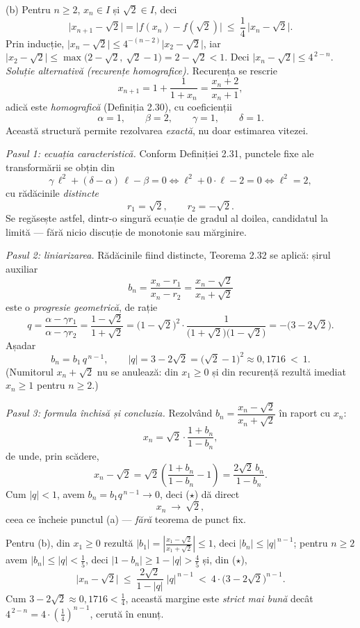 (b) Pentru $n\ge2$, $x_{n}\in I$ și $\sqrt2\in I$, deci
\[ \bigl|x_{n+1}-\sqrt2\bigr|=\bigl|f(x_{n})-f(\sqrt2)\bigr|\ \le\ \frac14\,\bigl|x_{n}-\sqrt2\bigr| . \]
Prin inducție, $\bigl|x_{n}-\sqrt2\bigr|\le4^{-(n-2)}\bigl|x_{2}-\sqrt2\bigr|$, iar $\bigl|x_{2}-\sqrt2\bigr|\le\max\bigl(2-\sqrt2,\ \sqrt2-1\bigr)=2-\sqrt2<1$. Deci $\bigl|x_{n}-\sqrt2\bigr|\le4^{\,2-n}$.\\[2pt]


\emph{Soluție alternativă (recurențe homografice).} Recurența se rescrie
\[ x_{n+1}=1+\frac{1}{1+x_{n}}=\frac{x_{n}+2}{x_{n}+1} , \]
adică este \emph{homografică} (Definiția 2.30), cu coeficienții
\[ \alpha=1,\qquad \beta=2,\qquad \gamma=1,\qquad \delta=1 . \]
Această structură permite rezolvarea \emph{exactă}, nu doar estimarea vitezei.

\emph{Pasul 1: ecuația caracteristică.} Conform Definiției 2.31, punctele fixe ale transformării se obțin din
\[ \gamma\,\ell^{2}+(\delta-\alpha)\,\ell-\beta=0 \Longleftrightarrow \ell^{2}+0\cdot\ell-2=0 \Longleftrightarrow \ell^{2}=2 , \]
cu rădăcinile \emph{distincte}
\[ r_{1}=\sqrt2,\qquad r_{2}=-\sqrt2 . \]
Se regăsește astfel, dintr-o singură ecuație de gradul al doilea, candidatul la limită --- fără nicio discuție de monotonie sau mărginire.

\emph{Pasul 2: liniarizarea.} Rădăcinile fiind distincte, Teorema 2.32 se aplică: șirul auxiliar
\[ b_{n}=\frac{x_{n}-r_{1}}{x_{n}-r_{2}}=\frac{x_{n}-\sqrt2}{x_{n}+\sqrt2} \]
este o \emph{progresie geometrică}, de rație
\[ q=\frac{\alpha-\gamma r_{1}}{\alpha-\gamma r_{2}}=\frac{1-\sqrt2}{1+\sqrt2}=\bigl(1-\sqrt2\bigr)^{2}\cdot\frac{1}{\bigl(1+\sqrt2\bigr)\bigl(1-\sqrt2\bigr)}=-\bigl(3-2\sqrt2\bigr) . \]
Așadar
\[ b_{n}=b_{1}\,q^{\,n-1},\qquad |q|=3-2\sqrt2=\bigl(\sqrt2-1\bigr)^{2}\approx0{,}1716\ <\ 1 . \]
(Numitorul $x_{n}+\sqrt2$ nu se anulează: din $x_{1}\ge0$ și din recurență rezultă imediat $x_{n}\ge1$ pentru $n\ge2$.)

\emph{Pasul 3: formula închisă și concluzia.} Rezolvând $b_{n}=\dfrac{x_{n}-\sqrt2}{x_{n}+\sqrt2}$ în raport cu $x_{n}$:
\[ x_{n}=\sqrt2\cdot\frac{1+b_{n}}{1-b_{n}} , \]
de unde, prin scădere,
\[ x_{n}-\sqrt2=\sqrt2\left(\frac{1+b_{n}}{1-b_{n}}-1\right)=\frac{2\sqrt2\,b_{n}}{1-b_{n}} . \tag{$\star$} \]
Cum $|q|<1$, avem $b_{n}=b_{1}q^{\,n-1}\to0$, deci ($\star$) dă direct
\[ x_{n}\ \longrightarrow\ \sqrt2 , \]
ceea ce încheie punctul (a) --- \emph{fără} teorema de punct fix.

Pentru (b), din $x_{1}\ge0$ rezultă $|b_{1}|=\left|\frac{x_{1}-\sqrt2}{x_{1}+\sqrt2}\right|\le1$, deci $|b_{n}|\le|q|^{\,n-1}$; pentru $n\ge2$ avem $|b_{n}|\le|q|<\frac15$, deci $|1-b_{n}|\ge1-|q|>\frac45$ și, din ($\star$),
\[ \bigl|x_{n}-\sqrt2\bigr|\ \le\ \frac{2\sqrt2}{1-|q|}\;|q|^{\,n-1}\ <\ 4\cdot\bigl(3-2\sqrt2\bigr)^{n-1} . \]
Cum $3-2\sqrt2\approx0{,}1716<\frac14$, această margine este \emph{strict mai bună} decât $4^{\,2-n}=4\cdot\left(\frac14\right)^{n-1}$, cerută în enunț.

